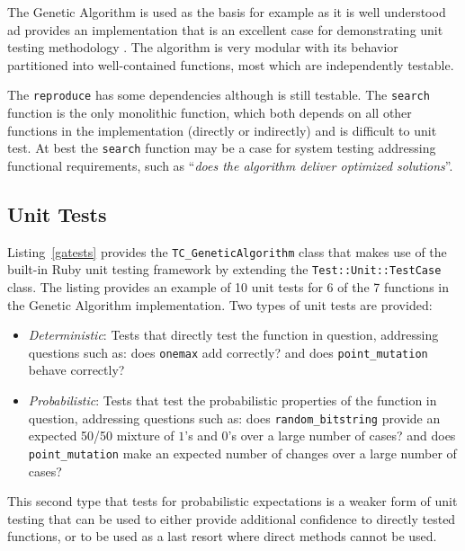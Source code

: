 \documentclass[a4paper, 11pt]{article}
\begin{document}
The Genetic Algorithm is used as the basis for example as it is well understood ad provides an implementation that is an excellent case for demonstrating unit testing methodology \cite{Brownlee2010p}. The algorithm is very modular with its behavior partitioned into well-contained functions, most which are independently testable. 

The \texttt{reproduce} has some dependencies although is still testable. The \texttt{search} function is the only monolithic function, which both depends on all other functions in the implementation (directly or indirectly) and is difficult to unit test. At best the \texttt{search} function may be a case for system testing addressing functional requirements, such as ``\emph{does the algorithm deliver optimized solutions}''.



\subsection{Unit Tests}
\label{subsec:tests}
Listing~\ref{gatests} provides the \texttt{TC\_GeneticAlgorithm} class that makes use of the built-in Ruby unit testing framework by extending the \texttt{Test::Unit::TestCase} class.
The listing provides an example of 10 unit tests for 6 of the 7 functions in the Genetic Algorithm implementation. Two types of unit tests are provided: 

\begin{itemize}
	\item \emph{Deterministic}: Tests that directly test the function in question, addressing questions such as: does \texttt{onemax} add correctly? and does \texttt{point\_mutation} behave correctly?
	\item \emph{Probabilistic}: Tests that test the probabilistic properties of the function in question, addressing questions such as: does \texttt{random\_bitstring} provide an expected 50/50 mixture of $1$'s and $0$'s over a large number of cases? and does \texttt{point\_mutation} make an expected number of changes over a large number of cases?
\end{itemize}

This second type that tests for probabilistic expectations is a weaker form of unit testing that can be used to either provide additional confidence to directly tested functions, or to be used as a last resort where direct methods cannot be used.
\end{document}
